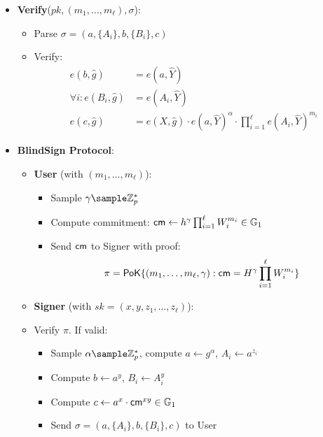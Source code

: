 \begin{itemize}
    \item \textbf{Verify}($pk, (m_1,\ldots,m_\ell), \sigma$):
    \begin{itemize}
        \item Parse $\sigma = (a, \{A_i\}, b, \{B_i\}, c)$
        \item Verify:
            \begin{align*}
                e(b, \hat{g}) &= e(a, \widehat{Y}) \\
                \forall i: e(B_i, \hat{g}) &= e(A_i, \widehat{Y}) \\
                e(c, \hat{g}) &= e(X, \hat{g}) \cdot e(a, \widehat{Y})^\alpha \cdot \prod_{i=1}^\ell e(A_i, \widehat{Y})^{m_i}
            \end{align*}
    \end{itemize}

    \item \textbf{BlindSign Protocol}:
    \begin{itemize}
        \item \textbf{User} (with $(m_1, \ldots, m_\ell)$):
            \begin{itemize}
                \item Sample $\gamma \sample \Z_p^*$
                \item Compute commitment: $\mathsf{cm} \gets h^\gamma\prod_{i=1}^\ell W_i^{m_i} \in \mathbb{G}_1$
                \item Send $\mathsf{cm}$ to Signer with proof:
                    \[
                    \pi = \mathsf{PoK}\{(m_1, \ldots, m_\ell, \gamma): \mathsf{cm} = H^\gamma\prod_{i=1}^\ell W_i^{m_i}\}
                    \]
            \end{itemize}
        
        \item \textbf{Signer} (with $sk = (x, y, z_1, \ldots, z_\ell)$):
        \item Verify $\pi$. If valid:
                
        \begin{itemize}
            \item Sample $\alpha \sample \Z_p^*$, compute $a \gets g^\alpha$, $A_i \gets a^{z_i}$
            \item Compute $b \gets a^y$, $B_i \gets A_i^y$
            \item Compute $c \gets a^x \cdot \mathsf{cm}^{xy} \in \mathbb{G}_1$
            \item Send $\sigma = (a, \{A_i\}, b, \{B_i\}, c)$ to User
        \end{itemize}



\end{itemize}
\end{itemize}
